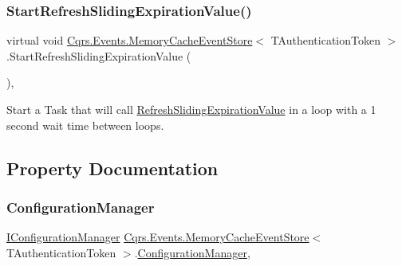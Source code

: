\subsubsection{\texorpdfstring{Start\+Refresh\+Sliding\+Expiration\+Value()}{StartRefreshSlidingExpirationValue()}}
{\footnotesize\ttfamily virtual void \hyperlink{classCqrs_1_1Events_1_1MemoryCacheEventStore}{Cqrs.\+Events.\+Memory\+Cache\+Event\+Store}$<$ T\+Authentication\+Token $>$.Start\+Refresh\+Sliding\+Expiration\+Value (\begin{DoxyParamCaption}{ }\end{DoxyParamCaption})\hspace{0.3cm}{\ttfamily [protected]}, {\ttfamily [virtual]}}



Start a Task that will call \hyperlink{classCqrs_1_1Events_1_1MemoryCacheEventStore_a4cac39acb87d9e25c4c090a384515d11_a4cac39acb87d9e25c4c090a384515d11}{Refresh\+Sliding\+Expiration\+Value} in a loop with a 1 second wait time between loops. 



\subsection{Property Documentation}
\mbox{\label{classCqrs_1_1Events_1_1MemoryCacheEventStore_a8a4fc4fa5d767e4d15344daf1ba7ea01_a8a4fc4fa5d767e4d15344daf1ba7ea01}} 
\subsubsection{\texorpdfstring{Configuration\+Manager}{ConfigurationManager}}
{\footnotesize\ttfamily \hyperlink{interfaceCqrs_1_1Configuration_1_1IConfigurationManager}{I\+Configuration\+Manager} \hyperlink{classCqrs_1_1Events_1_1MemoryCacheEventStore}{Cqrs.\+Events.\+Memory\+Cache\+Event\+Store}$<$ T\+Authentication\+Token $>$.\hyperlink{classCqrs_1_1Configuration_1_1ConfigurationManager}{Configuration\+Manager}\hspace{0.3cm}{\ttfamily [get]}, {\ttfamily [protected]}}



